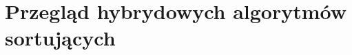 \chapter{Przegląd hybrydowych algorytmów sortujących}
\thispagestyle{chapterBeginStyle}















